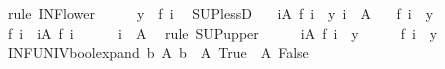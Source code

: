\begin{isabellebody}
\ {\isacharparenleft}{\kern0pt}rule\ INF{\isacharunderscore}{\kern0pt}lower{\isacharparenright}{\kern0pt}\isanewline
\ \ \isamarkupfalse%
\ \isamarkupfalse%
\ {\isachardoublequoteopen}y\ {\isacharless}{\kern0pt}\ f\ i{\isachardoublequoteclose}\ \isacommand{{\isachardot}{\kern0pt}}\isamarkupfalse%
\isanewline
{}\isamarkupfalse%
%
\endisatagproof
{\isafoldproof}%
%
\isadelimproof
\isanewline
%
\endisadelimproof
\isanewline
{}\isamarkupfalse%
\ SUP{\isacharunderscore}{\kern0pt}lessD{\isacharcolon}{\kern0pt}\isanewline
\ \ \ {\isachardoublequoteopen}{\isacharparenleft}{\kern0pt}{\isasymSqunion}i{\isasymin}A{\isachardot}{\kern0pt}\ f\ i{\isacharparenright}{\kern0pt}\ {\isacharless}{\kern0pt}\ y{\isachardoublequoteclose}\ {\isachardoublequoteopen}i\ {\isasymin}\ A{\isachardoublequoteclose}\isanewline
\ \ \ {\isachardoublequoteopen}f\ i\ {\isacharless}{\kern0pt}\ y{\isachardoublequoteclose}\isanewline
%
\isadelimproof
%
\endisadelimproof
%
\isatagproof
{}\isamarkupfalse%
\ {\isacharminus}{\kern0pt}\isanewline
\ \ \isamarkupfalse%
\ {\isachardoublequoteopen}f\ i\ {\isasymle}\ {\isacharparenleft}{\kern0pt}{\isasymSqunion}i{\isasymin}A{\isachardot}{\kern0pt}\ f\ i{\isacharparenright}{\kern0pt}{\isachardoublequoteclose}\isanewline
\ \ \ \ \isamarkupfalse%
\ {\isacartoucheopen}i\ {\isasymin}\ A{\isacartoucheclose}\ \isamarkupfalse%
\ {\isacharparenleft}{\kern0pt}rule\ SUP{\isacharunderscore}{\kern0pt}upper{\isacharparenright}{\kern0pt}\isanewline
\ \ \isamarkupfalse%
\ \isamarkupfalse%
\ {\isacartoucheopen}{\isacharparenleft}{\kern0pt}{\isasymSqunion}i{\isasymin}A{\isachardot}{\kern0pt}\ f\ i{\isacharparenright}{\kern0pt}\ {\isacharless}{\kern0pt}\ y{\isacartoucheclose}\isanewline
\ \ \isamarkupfalse%
\ \isamarkupfalse%
\ {\isachardoublequoteopen}f\ i\ {\isacharless}{\kern0pt}\ y{\isachardoublequoteclose}\ \isacommand{{\isachardot}{\kern0pt}}\isamarkupfalse%
\isanewline
{}\isamarkupfalse%
%
\endisatagproof
{\isafoldproof}%
%
\isadelimproof
\isanewline
%
\endisadelimproof
\isanewline
{}\isamarkupfalse%
\ INF{\isacharunderscore}{\kern0pt}UNIV{\isacharunderscore}{\kern0pt}bool{\isacharunderscore}{\kern0pt}expand{\isacharcolon}{\kern0pt}\ {\isachardoublequoteopen}{\isacharparenleft}{\kern0pt}{\isasymSqinter}b{\isachardot}{\kern0pt}\ A\ b{\isacharparenright}{\kern0pt}\ {\isacharequal}{\kern0pt}\ A\ True\ {\isasymsqinter}\ A\ False{\isachardoublequoteclose}\isanewline

\end{isabellebody}
